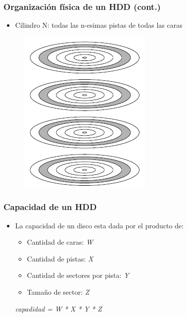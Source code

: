 \begin{frame}
  \frametitle{Organización física de un \textbf{HDD} (cont.)}
  \begin{itemize}
    \item Cilindro N: todas las n-esimas pistas de todas las caras
  \end{itemize}
  \begin{figure}
    \includegraphics[scale=0.4]{images/cylinders.png}
  \end{figure}
\end{frame}

\begin{frame}
  \frametitle{Capacidad de un \textbf{HDD}}
  \begin{itemize}
    \item La capacidad de un disco esta dada por el producto de:
    \begin{itemize}
      \item Cantidad de caras: \emph{W}
      \item Cantidad de pistas: \emph{X}
      \item Cantidad de sectores por pista: \emph{Y}
      \item Tamaño de sector: \emph{Z}
    \end{itemize}

    \emph{capadidad = W * X * Y * Z}
  \end{itemize}
\end{frame}

